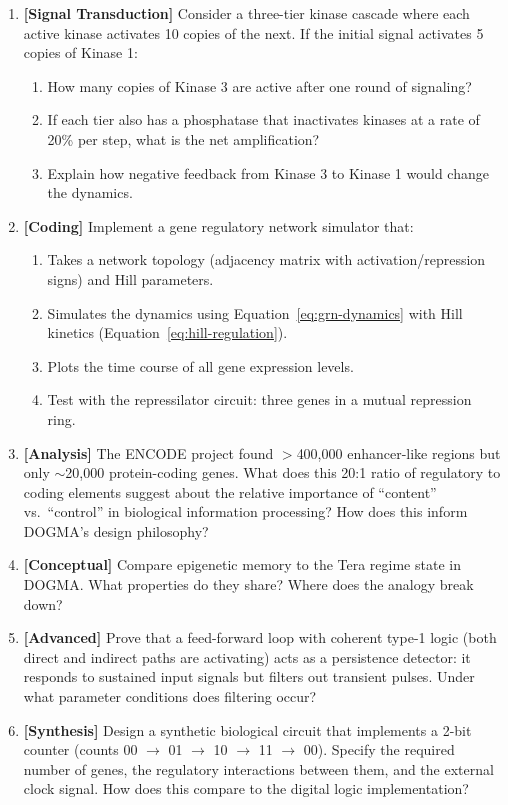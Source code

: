 \begin{enumerate}[label=\textbf{3.\arabic*.}, leftmargin=2.5em]
\item \textbf{[Signal Transduction]} Consider a three-tier kinase cascade where each active kinase activates 10 copies of the next. If the initial signal activates 5 copies of Kinase 1:
  \begin{enumerate}[label=(\alph*)]
    \item How many copies of Kinase 3 are active after one round of signaling?
    \item If each tier also has a phosphatase that inactivates kinases at a rate of 20\% per step, what is the net amplification?
    \item Explain how negative feedback from Kinase 3 to Kinase 1 would change the dynamics.
  \end{enumerate}

\item \textbf{[Coding]} Implement a gene regulatory network simulator that:
  \begin{enumerate}[label=(\alph*)]
    \item Takes a network topology (adjacency matrix with activation/repression signs) and Hill parameters.
    \item Simulates the dynamics using Equation~\ref{eq:grn-dynamics} with Hill kinetics (Equation~\ref{eq:hill-regulation}).
    \item Plots the time course of all gene expression levels.
    \item Test with the repressilator circuit: three genes in a mutual repression ring.
  \end{enumerate}

\item \textbf{[Analysis]} The ENCODE project found $>$400,000 enhancer-like regions but only $\sim$20,000 protein-coding genes. What does this 20:1 ratio of regulatory to coding elements suggest about the relative importance of ``content'' vs.\ ``control'' in biological information processing? How does this inform DOGMA's design philosophy?

\item \textbf{[Conceptual]} Compare epigenetic memory to the Tera regime state in DOGMA. What properties do they share? Where does the analogy break down?

\item \textbf{[Advanced]} Prove that a feed-forward loop with coherent type-1 logic (both direct and indirect paths are activating) acts as a persistence detector: it responds to sustained input signals but filters out transient pulses. Under what parameter conditions does filtering occur?

\item \textbf{[Synthesis]} Design a synthetic biological circuit that implements a 2-bit counter (counts 00 $\to$ 01 $\to$ 10 $\to$ 11 $\to$ 00). Specify the required number of genes, the regulatory interactions between them, and the external clock signal. How does this compare to the digital logic implementation?

\end{enumerate}

